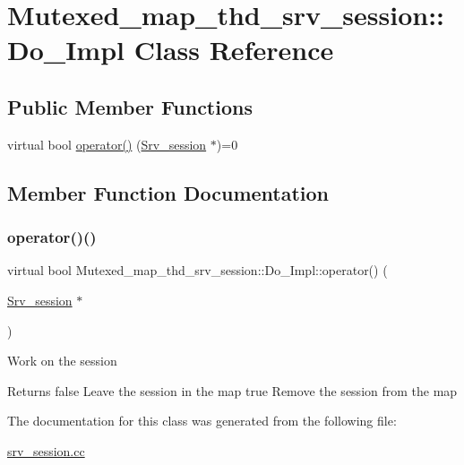 \hypertarget{classMutexed__map__thd__srv__session_1_1Do__Impl}{}\section{Mutexed\+\_\+map\+\_\+thd\+\_\+srv\+\_\+session\+:\+:Do\+\_\+\+Impl Class Reference}
\label{classMutexed__map__thd__srv__session_1_1Do__Impl}
\subsection*{Public Member Functions}
\begin{DoxyCompactItemize}
\item 
virtual bool \mbox{\hyperlink{classMutexed__map__thd__srv__session_1_1Do__Impl_ac13a5d92103439b094f7cbf08556f927}{operator()}} (\mbox{\hyperlink{classSrv__session}{Srv\+\_\+session}} $\ast$)=0
\end{DoxyCompactItemize}


\subsection{Member Function Documentation}
\mbox{\label{classMutexed__map__thd__srv__session_1_1Do__Impl_ac13a5d92103439b094f7cbf08556f927}} 
\subsubsection{\texorpdfstring{operator()()}{operator()()}}
{\footnotesize\ttfamily virtual bool Mutexed\+\_\+map\+\_\+thd\+\_\+srv\+\_\+session\+::\+Do\+\_\+\+Impl\+::operator() (\begin{DoxyParamCaption}\item[{\mbox{\hyperlink{classSrv__session}{Srv\+\_\+session}} $\ast$}]{ }\end{DoxyParamCaption})\hspace{0.3cm}{\ttfamily [pure virtual]}}

Work on the session

\begin{DoxyReturn}{Returns}
false Leave the session in the map true Remove the session from the map 
\end{DoxyReturn}


The documentation for this class was generated from the following file\+:\begin{DoxyCompactItemize}
\item 
\mbox{\hyperlink{srv__session_8cc}{srv\+\_\+session.\+cc}}\end{DoxyCompactItemize}
